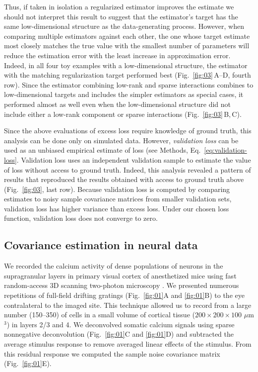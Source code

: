 \documentclass[10pt]{article}
\begin{document}
Thus, if taken in isolation a regularized estimator improves the estimate we should not interpret this result to suggest that the estimator's target has the same low-dimensional structure as the data-generating process. However, when comparing multiple estimators against each other, the one whose target estimate most closely matches the true value with the smallest number of parameters will reduce the estimation error with the least increase in approximation error. Indeed, in all four toy examples with a low-dimensional structure, the estimator with the matching regularization target performed best (Fig.~\ref{fig:03}\,A--D, fourth row). 
Since the estimator combining low-rank and sparse interactions combines to low-dimensional targets and includes the simpler estimators as special cases, it performed almost as well even when the low-dimensional structure did not include either a low-rank component or sparse interactions (Fig.~\ref{fig:03}\,B,\,C). 

Since the above evaluations of excess loss require knowledge of ground truth, this analysis can be done only on simulated data. However, \emph{validation loss} can be used as an unbiased empirical estimate of loss  (see Methods, Eq.~\ref{eq:validation-loss}. Validation loss uses an independent validation sample to estimate the value of loss without access to ground truth.   Indeed, this analysis revealed a pattern of results that reproduced the results obtained with access to ground truth above (Fig.~\ref{fig:03}, last row). Because validation loss is computed by comparing estimates to noisy sample covariance matrices from smaller validation sets, validation loss has higher variance than excess loss. Under our chosen loss function, validation loss does not converge to zero. 

\subsection*{Covariance estimation in neural data}

We recorded the calcium activity of dense populations of neurons in the supragranular layers in primary visual cortex of anesthetized mice using fast random-access 3D scanning two-photon microscopy \cite{Stosiek:2003,Reddy:2005}. We presented numerous repetitions of full-field drifting gratings (Fig.~\ref{fig:01}A and \ref{fig:01}B) to the eye contralateral to the imaged site. This technique allowed us to record from a large number (150--350) of cells in a small volume of cortical tissue ($200\times200\times100$ $\mu$m$^3$) in layers 2/3 and 4. We deconvolved somatic calcium signals using sparse nonnegative deconvolution \cite{Vogelstein:2010} (Fig.~\ref{fig:01}C and \ref{fig:01}D) and subtracted the average stimulus response to remove averaged linear effects of the stimulus. From this residual response we computed the sample noise covariance matrix (Fig.~\ref{fig:01}E).
\end{document}
